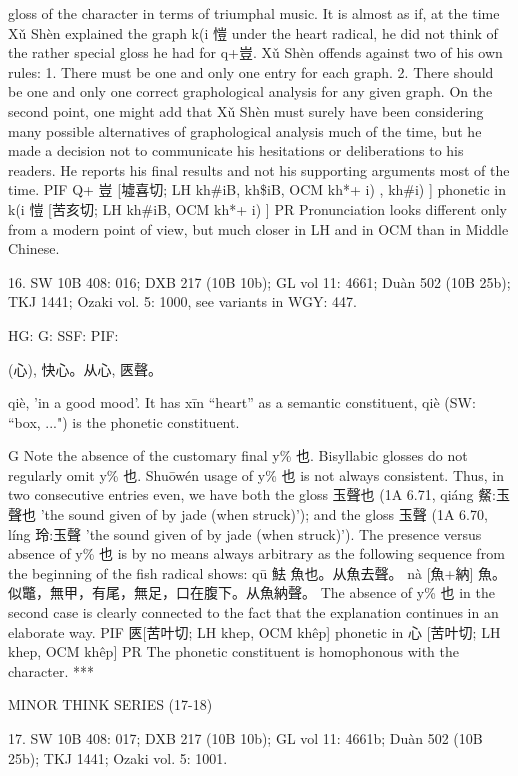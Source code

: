 gloss of the character in terms of triumphal music. It is almost as if, at the time Xǔ Shèn explained the graph k(i 愷 under the heart radical, he did not think of the rather special gloss he had for q+豈. Xǔ Shèn offends against two of his own rules:
1. There must be one and only one entry for each graph.
2. There should be one and only one correct graphological analysis for any given graph.
On the second point, one might add that Xǔ Shèn must surely have been considering many possible alternatives of graphological analysis much of the time, but he made a decision not to communicate his hesitations or deliberations to his readers. He reports his final results and not his supporting arguments most of the time.
PIF      Q+ 豈 [墟喜切; LH kh\#iB, kh\$iB, OCM kh*+ i) , kh\#i) ] phonetic in k(i 愷 [苦亥切; LH kh\#iB, OCM kh*+ i) ]
PR Pronunciation looks different only from a modern point of view, but much closer in LH and in OCM than in Middle Chinese.

16. SW 10B 408: 016; DXB 217 (10B 10b); GL vol 11: 4661; Duàn 502 (10B 25b); TKJ 1441; Ozaki vol. 5: 1000, see
variants in WGY: 447.


HG:
G: SSF: PIF:

(心),
快心。从心, 匧聲。

qiè,
'in a good mood'.
It has xīn ``heart'' as a semantic constituent,
qiè (SW: ``box, ...") is the phonetic constituent.

G Note the absence of the customary final y\% 也. Bisyllabic glosses do not regularly omit y\% 也. Shuōwén usage of y\% 也 is not always consistent. Thus, in two consecutive entries even, we have both the gloss 玉聲也 (1A 6.71, qiáng 䱗:玉聲也 'the sound given of by jade (when struck)'); and the gloss 玉聲 (1A 6.70, líng 玲:玉聲 'the sound given of by jade (when struck)').
    The presence versus absence of y\% 也 is by no means always arbitrary as the following sequence from the beginning of the fish radical shows:
qū 魼	魚也。从魚去聲。
nà [魚+納]	魚。似鼈，無甲，有尾，無足，口在腹下。从魚納聲。
    The absence of y\% 也 in the second case is clearly connected to the fact that the explanation continues in an elaborate way.
PIF    匧[苦叶切; LH khep, OCM khêp] phonetic in 心 [苦叶切; LH khep, OCM khêp]
PR	The phonetic constituent is homophonous with the character.
***



MINOR THINK SERIES (17-18)

17. SW 10B 408: 017; DXB 217 (10B 10b); GL vol 11: 4661b; Duàn 502 (10B 25b); TKJ 1441; Ozaki vol. 5: 1001.


